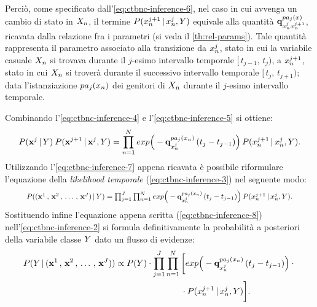 Perciò, come specificato dall'\autoref{eq:ctbnc-inference-6}, nel caso in cui avvenga un cambio di stato in $\mathnormal{X}_n$, il termine $P(\mathnormal{x}_n^{j+1}\,\arrowvert\,\mathnormal{x}_n^j,\mathnormal{Y})$ equivale alla quantità $\boldsymbol{\textbf{\text{q}}}_{\mathnormal{x}_n^j\mathnormal{x}_n^{j+1}}^{pa_j(\mathnormal{x})}$, ricavata dalla relazione fra i parametri (si veda il \autoref{th:rel-params}). Tale quantità rappresenta il parametro associato alla transizione da $\mathnormal{x}_n^j$, stato in cui la variabile casuale $\mathnormal{X}_n$ si trovava durante il $j$-esimo intervallo temporale $[\,t_{j-1},\,t_j)$, a $\mathnormal{x}_n^{j+1}$, stato in cui $\mathnormal{X}_n$ si troverà durante il successivo intervallo temporale $[\,t_j,\,t_{j+1})$; data l'istanziazione $pa_j(\mathnormal{x}_n)$ dei genitori di $\mathnormal{X}_n$ durante il $j$-esimo intervallo temporale.

Combinando l'\autoref{eq:ctbnc-inference-4} e l'\autoref{eq:ctbnc-inference-5} si ottiene:
\footnotesize
\begin{equation}\label{eq:ctbnc-inference-7}
P(\mathbf{x}^j\,\arrowvert\,\mathnormal{Y})\:P(\mathbf{x}^{j+1}\,\arrowvert\,\mathbf{x}^j,\mathnormal{Y})=\prod_{n=1}^N exp\Big(-\boldsymbol{\textbf{\text{q}}}_{\mathnormal{x}_n^j}^{pa_j(\mathnormal{x}_n)}\,(t_j - t_{j-1})\Big)\,P(\mathnormal{x}_n^{j+1}\,\arrowvert\,\mathnormal{x}_n^j,\mathnormal{Y})\text{\normalsize .}
\end{equation}
\normalsize
Utilizzando l'\autoref{eq:ctbnc-inference-7} appena ricavata è possibile riformulare l'equazione della \emph{likelihood temporale} (\ref{eq:ctbnc-inference-3}) nel seguente modo:
\begin{equation}\label{eq:ctbnc-inference-8}
\resizebox{.89\hsize}{!}{$P(\evidencestream{J}\,\arrowvert\,\setel{Y})=\prod_{j=1}^{J}\prod_{n=1}^N exp\Big(-\param{q}_{\setel{x}_n^j}^{pa_j(\setel{x}_n)}\,(t_j - t_{j-1})\Big)\,P(\setel{x}_n^{j+1}\,\arrowvert\,\setel{x}_n^j,\setel{Y})$}\text{.}
\end{equation}
Sostituendo infine l'equazione appena scritta (\ref{eq:ctbnc-inference-8}) nell'\autoref{eq:ctbnc-inference-2} si formula definitivamente la probabilità a posteriori della variabile classe $\mathnormal{Y}$ dato un flusso di evidenze:
\begin{align}\label{eq:ctbnc-inference-9}
P(\mathnormal{Y}\,\arrowvert\,(\mathbf{x}^1\,,\,\mathbf{x}^2\,,\,\dotsc\,,\,\mathbf{x}^{J})) &\propto P(\mathnormal{Y}) \cdot \prod_{j=1}^{J}\prod_{n=1}^N \bigg[ exp\Big(-\boldsymbol{\textbf{\text{q}}}_{\mathnormal{x}_n^j}^{pa_j(\mathnormal{x}_n)}\,(t_j - t_{j-1})\Big) \cdot \bigg.\nonumber\\
& \qquad \bigg.{} \qquad \qquad \qquad \! \! \cdot P(\mathnormal{x}_n^{j+1}\,\arrowvert\,\mathnormal{x}_n^j,\mathnormal{Y}) \bigg]\text{.}
\end{align}
